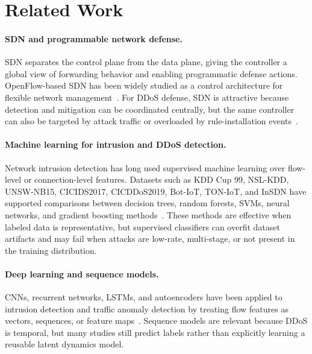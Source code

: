 \documentclass[runningheads]{llncs}
\begin{document}
\section{Related Work}

\paragraph{SDN and programmable network defense.}
SDN separates the control plane from the data plane, giving the controller a
global view of forwarding behavior and enabling programmatic defense actions.
OpenFlow-based SDN has been widely studied as a control architecture for
flexible network management~\cite{mckeown2008openflow,kreutz2015sdn}. For
DDoS defense, SDN is attractive because detection and mitigation can be
coordinated centrally, but the same controller can also be targeted by attack
traffic or overloaded by rule-installation events~\cite{yan2016sdn_ddos,scott2016ddos_sdn}.

\paragraph{Machine learning for intrusion and DDoS detection.}
Network intrusion detection has long used supervised machine learning over
flow-level or connection-level features. Datasets such as KDD Cup 99,
NSL-KDD, UNSW-NB15, CICIDS2017, CICDDoS2019, Bot-IoT, TON-IoT, and InSDN have
supported comparisons between decision trees, random forests, SVMs, neural
networks, and gradient boosting methods~\cite{tavallaee2009nslkdd,moustafa2015unsw,sharafaldin2018cicids,sharafaldin2019cicddos,koroniotis2019botiot,moustafa2020toniot,elsayed2020insdn}. These methods are
effective when labeled data is representative, but supervised classifiers can
overfit dataset artifacts and may fail when attacks are low-rate, multi-stage,
or not present in the training distribution.

\paragraph{Deep learning and sequence models.}
CNNs, recurrent networks, LSTMs, and autoencoders have been applied to
intrusion detection and traffic anomaly detection by treating flow features as
vectors, sequences, or feature maps~\cite{kim2016lstm_ids,vinayakumar2019deep,javaid2016deep,mirsky2018kitsune}. Sequence models are relevant because DDoS
is temporal, but many studies still predict labels rather than explicitly
learning a reusable latent dynamics model.
\end{document}
